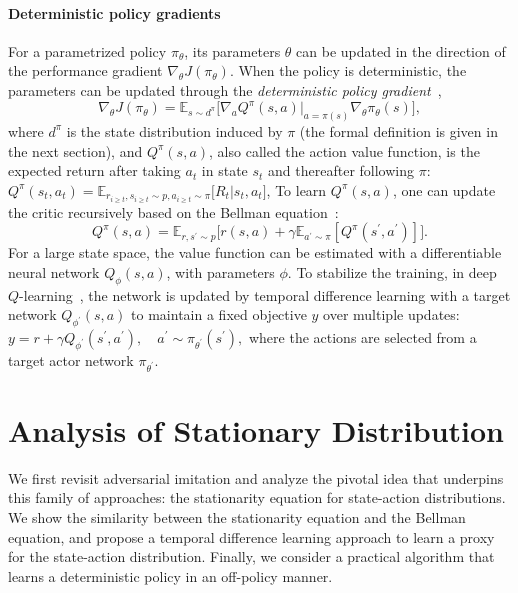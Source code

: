 \documentclass[letterpaper]{article} %
\begin{document}
\paragraph{Deterministic policy gradients}
For a parametrized policy $\pi_{\theta}$, its parameters $\theta$ can be updated in the direction of the performance gradient $\nabla_{\theta}J(\pi_{\theta})$.
When the policy is deterministic, the parameters can be updated through the \textit{deterministic policy gradient}~\cite{silver2014deterministic},
\begin{equation}\label{equ:deterministic-pg}
\nabla_{\theta}J(\pi_\theta) = \mathbb{E}_{s\sim d^\pi} \big[ \nabla_a Q^\pi(s, a)|_{a=\pi(s)}\nabla_{\theta}\pi_{\theta}(s) \big],
\end{equation}
where $d^\pi$ is the state distribution induced by $\pi$ (the formal definition is given in the next section),
and $Q^\pi(s, a)$, also called the action value function, is the expected return after taking $a_t$ in state $s_t$ and thereafter following $\pi$: $Q^{\pi}(s_t, a_t) = \mathbb{E}_{r_{i\geq t}, s_{i\geq t}\sim p, a_{i\geq t}\sim\pi}\big[ R_t| s_t, a_t \big]$,
To learn $Q^{\pi}(s, a)$, one can update the critic recursively based on the Bellman equation~\cite{sutton2018reinforcement}:
\begin{equation}\label{equ:bellman-equation}
Q^{\pi}(s, a) = \mathbb{E}_{r, s^\prime\sim p}\big[ r(s, a) + \gamma \mathbb{E}_{a^\prime\sim \pi} [Q^\pi(s^\prime, a^\prime)] \big].
\end{equation}
For a large state space, the value function can be estimated with a differentiable neural network $Q_{\phi}(s, a)$, with parameters $\phi$.
To stabilize the training, in deep $Q$-learning~\cite{mnih2015human}, the network is updated by temporal difference learning with a target network $Q_{\phi^\prime}(s, a)$ to maintain a fixed objective $y$ over multiple updates:
$y = r + \gamma Q_{\phi^\prime}(s^\prime, a^\prime), \quad a^\prime\sim\pi_{\theta^\prime}(s^\prime),$
where the actions are selected from a target actor network $\pi_{\theta^\prime}$.


\section{Analysis of Stationary Distribution}\label{sec:d2-imitation}
We first revisit adversarial imitation
and analyze the pivotal idea that underpins this family of approaches: the stationarity equation for state-action distributions.
We show the similarity between the stationarity equation and the Bellman equation,
and propose a temporal difference learning approach to learn a proxy for the state-action distribution.
Finally, we consider a practical algorithm that learns a deterministic policy in an off-policy manner.
\end{document}
